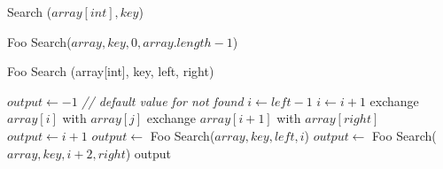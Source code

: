 \documentclass[a4paper]{article}
\theoremstyle{remarksStyle}
\theoremstyle{questionStyle}
\theoremstyle{answerStyle}
\begin{document}
\begin{algorithm}[H]\caption{Search ($array[int], key$)}
 \begin{algorithmic}[1]
  \RETURN   Foo Search($array, key, 0, array.length -1$) 
  \end{algorithmic} 
\end{algorithm} 



\begin{algorithm}[H]
  \caption{Foo Search (array[int], key, left, right)}
  \begin{algorithmic}[1]
    \STATE $output \gets -1$ \quad \textit{// default value for not found}
    \STATE  $i \gets left - 1$
              \STATE $i \gets i+1$
              \STATE exchange $array[i]$ with $array[j]$
          \ENDIF
      \ENDFOR  
      \STATE exchange $array[i+1]$ with $array[right]$
          \STATE  $output \gets i+1$
         \STATE  $output \gets$  Foo Search($array, key, left, i$)
      \ELSE
          \STATE $output \gets$    Foo Search($array, key, i+2, right$)
      \ENDIF
    \ENDIF
    \RETURN output
  \end{algorithmic} 
\end{algorithm} 



\newpage
\end{document}
